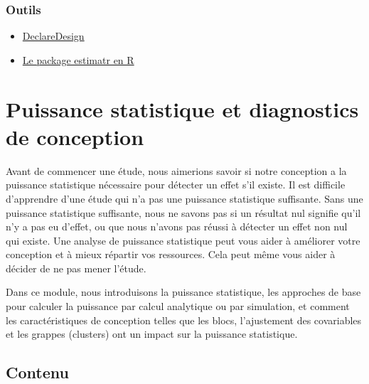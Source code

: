 \documentclass[
  12pt,
]{book}
\begin{document}
\hypertarget{outils-2}{%
\subsection{Outils}\label{outils-2}}

\begin{itemize}
\item
  \href{https://declaredesign.org}{DeclareDesign}
\item
  \href{https://declaredesign.org/r/estimatr/}{Le package estimatr en R}
\end{itemize}

\hypertarget{puissance-statistique-et-diagnostics-de-conception}{%
\chapter{Puissance statistique et diagnostics de conception}\label{puissance-statistique-et-diagnostics-de-conception}}

Avant de commencer une étude, nous aimerions savoir si notre conception a la puissance statistique nécessaire pour détecter un effet s'il existe. Il est difficile d'apprendre d'une étude qui n'a pas une puissance statistique suffisante. Sans une puissance statistique suffisante, nous ne savons pas si un résultat nul signifie qu'il n'y a pas eu d'effet, ou que nous n'avons pas réussi à détecter un effet non nul qui existe. Une analyse de puissance statistique peut vous aider à améliorer votre conception et à mieux répartir vos ressources. Cela peut même vous aider à décider de ne pas mener l'étude.

Dans ce module, nous introduisons la puissance statistique, les approches de base pour calculer la puissance par calcul analytique ou par simulation, et comment les caractéristiques de conception telles que les blocs, l'ajustement des covariables et les grappes (clusters) ont un impact sur la puissance statistique.

\hypertarget{contenu-5}{%
\section{Contenu}\label{contenu-5}}
\end{document}
